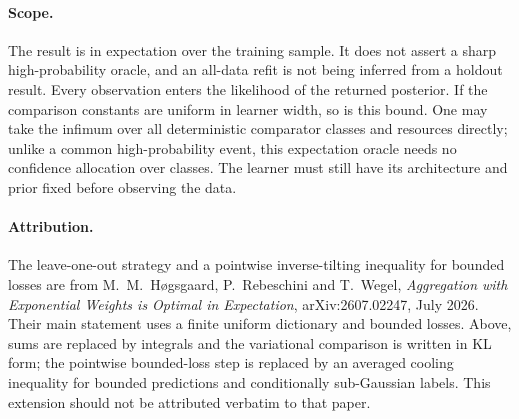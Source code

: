 \paragraph{Scope.}
The result is in expectation over the training sample. It does not
assert a sharp high-probability oracle, and an all-data refit is not
being inferred from a holdout result. Every observation enters the
likelihood of the returned posterior. If the comparison constants are
uniform in learner width, so is this bound. One may take the infimum
over all deterministic comparator classes and resources directly;
unlike a common high-probability event, this expectation oracle needs
no confidence allocation over classes. The learner must still have
its architecture and prior fixed before observing the data.

\paragraph{Attribution.}
The leave-one-out strategy and a pointwise inverse-tilting inequality
for bounded losses are from M.~M.~H\o gsgaard, P.~Rebeschini and
T.~Wegel, \emph{Aggregation with Exponential Weights is Optimal in
Expectation}, arXiv:2607.02247, July 2026. Their main statement uses a
finite uniform dictionary and bounded losses. Above, sums are replaced
by integrals and the variational comparison is written in KL form;
the pointwise bounded-loss step is replaced by an averaged cooling
inequality for bounded predictions and conditionally sub-Gaussian
labels. This extension should not be attributed verbatim to that paper.
